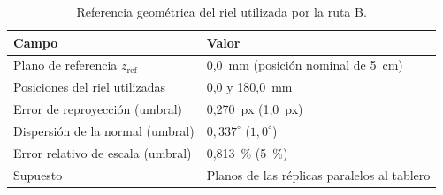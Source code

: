 
\begin{table}[htbp]
\centering\small
\caption{Referencia geométrica del riel utilizada por la ruta B.}
\label{tab:riel}
\begin{tabular}{@{}p{6cm}p{7cm}@{}}
\toprule
Campo & Valor \\
\midrule
Plano de referencia $z_{\mathrm{ref}}$ & 0,0~mm (posición nominal de 5~cm) \\
Posiciones del riel utilizadas & 0,0 y 180,0~mm \\
Error de reproyección (umbral) & 0,270~px (1,0~px) \\
Dispersión de la normal (umbral) & $0{,}337^{\circ}$ ($1{,}0^{\circ}$) \\
Error relativo de escala (umbral) & 0,813~\% (5~\%) \\
Supuesto & Planos de las réplicas paralelos al tablero \\
\bottomrule
\end{tabular}
\end{table}

